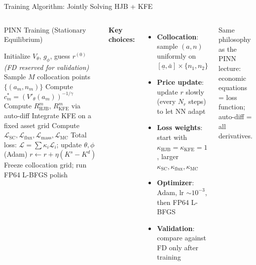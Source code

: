 \documentclass[aspectratio=169,11pt]{beamer}
\newcommand{\emphc}[1]{\textcolor{harvardcrimson}{#1}}
\newcommand{\ubar}[1]{\underline{#1}}
\begin{document}
\begin{frame}{Training Algorithm: Jointly Solving HJB + KFE}
\begin{columns}[T]
\begin{block}{PINN Training (Stationary Equilibrium)}
\footnotesize
\setlength{\itemsep}{0pt}
\begin{algorithmic}[1]
\STATE Initialize $V_\theta$, $g_\phi$, guess $r^{(0)}$ \;\;\textit{(FD reserved for validation)}
    \STATE Sample $M$ collocation points $\{(a_m, n_m)\}$
    \STATE Compute $c_m^* = (V'_\theta(a_m))^{-1/\gamma}$
    \STATE Compute $R_{\text{HJB}}^m$, $R_{\text{KFE}}^m$ via auto-diff
    \STATE Integrate KFE on a fixed asset grid
    \STATE Compute $\mathcal{L}_{\text{SC}}, \mathcal{L}_{\text{flux}}, \mathcal{L}_{\text{mass}}, \mathcal{L}_{\text{MC}}$
    \STATE Total loss: $\mathcal{L} = \sum \kappa_i \mathcal{L}_i$;\; update $\theta,\phi$ (Adam)
        \STATE $r \leftarrow r + \eta(K^s - K^d)$
    \ENDIF
\ENDFOR
\STATE Freeze collocation grid; run FP64 L-BFGS polish
\end{algorithmic}
\end{block}

\footnotesize
\textbf{Key choices:}
\begin{itemize}\itemsep0pt
    \item \textbf{Collocation}: sample $(a,n)$ uniformly on $[\ubar{a}, \bar{a}] \times \{n_1, n_2\}$
    \item \textbf{Price update}: update $r$ slowly (every $N_r$ steps) to let NN adapt
    \item \textbf{Loss weights}: start with $\kappa_{\text{HJB}}=\kappa_{\text{KFE}}=1$, larger $\kappa_{\text{SC}},\kappa_{\text{flux}},\kappa_{\text{MC}}$
    \item \textbf{Optimizer}: Adam, lr $\sim 10^{-3}$, then FP64 L-BFGS
    \item \textbf{Validation}: compare against FD only after training
\end{itemize}

\vspace{0.15em}
\begin{center}
\colorbox{uzhgreylight}{\parbox{0.95\columnwidth}{\centering\scriptsize
Same philosophy as the PINN lecture: \emphc{economic equations = loss function};
\emphc{auto-diff = all derivatives}.}}
\end{center}
\end{columns}
\end{frame}
\end{document}
